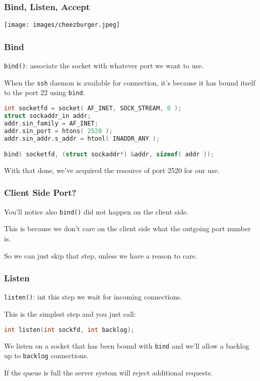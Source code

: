 \begin{frame}
	\frametitle{Bind, Listen, Accept}

	\begin{center}
		\texttt{[image: images/cheezburger.jpeg]}
	\end{center}

\end{frame}


\begin{frame}[fragile]
	\frametitle{Bind}

	\texttt{bind()}: associate the socket with whatever port we want to use.

	When the \texttt{ssh} daemon is available for connection, it's because it has bound itself to the port 22 using \texttt{bind}.

	\begin{lstlisting}[language=C]
int socketfd = socket( AF_INET, SOCK_STREAM, 0 );
struct sockaddr_in addr;
addr.sin_family = AF_INET;
addr.sin_port = htons( 2520 );
addr.sin_addr.s_addr = htonl( INADDR_ANY );

bind( socketfd, (struct sockaddr*) &addr, sizeof( addr ));
\end{lstlisting}

	With that done, we've acquired the resource of port 2520 for our use.

\end{frame}


\begin{frame}
	\frametitle{Client Side Port?}

	You'll notice also \texttt{bind()} did not happen on the client side.

	This is because we don't care on the client side what the outgoing port number is.

	So we can just skip that step, unless we have a reason to care.

\end{frame}


\begin{frame}[fragile]
	\frametitle{Listen}

	\texttt{listen()}: int this step we wait for incoming connections.

	This is the simplest step and you just call:

	\begin{lstlisting}[language=C]
int listen(int sockfd, int backlog); 
\end{lstlisting}

	We listen on a socket that has been bound with \texttt{bind} and we'll allow a backlog up to \texttt{backlog} connections.

	If the queue is full the server system will reject additional requests.


\end{frame}


